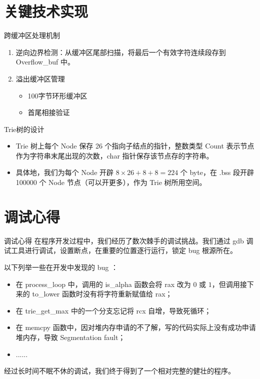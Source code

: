 \documentclass{beamer}
\begin{document}
\section{关键技术实现}
\begin{frame}{跨缓冲区处理机制}
\begin{enumerate}
\item 逆向边界检测：从缓冲区尾部扫描，将最后一个有效字符连续段存到 Overflow\_buf 中。
\item 溢出缓冲区管理
\begin{itemize}
\item 100字节环形缓冲区
\item 首尾相接验证
\end{itemize}
\end{enumerate}
\end{frame}

\begin{frame}{Trie树的设计}
\begin{itemize}
\item Trie 树上每个 Node 保存 26 个指向子结点的指针，整数类型 Count 表示节点作为字符串末尾出现的次数，char 指针保存该节点存的字符串。
\item 具体地，我们为每个 Node 开辟 $8 \times 26 + 8 + 8 = 224$ 个 byte，在 .bss 段开辟 100000 个 Node 节点（可以开更多），作为 Trie 树所用空间。
\end{itemize}
\end{frame}

\section{调试心得}
\begin{frame}{调试心得}
在程序开发过程中，我们经历了数次棘手的调试挑战。我们通过 gdb 调试工具进行调试，设置断点，在重要的位置逐行运行，锁定 bug 根源所在。

以下列举一些在开发中发现的 bug ：
\begin{itemize}
\item 在 process\_loop 中，调用的 is\_alpha 函数会将 rax 改为 $0$ 或 $1$，但调用接下来的 to\_lower 函数时没有将字符重新赋值给 rax；
\item 在 trie\_get\_max 中的一个分支忘记将 rcx 自增，导致死循环；
\item 在 memcpy 函数中，因对堆内存申请的不了解，写的代码实际上没有成功申请堆内存，导致 Segmentation fault；
\item ......
\end{itemize}

经过长时间不眠不休的调试，我们终于得到了一个相对完整的健壮的程序。
\end{frame}
\end{document}
